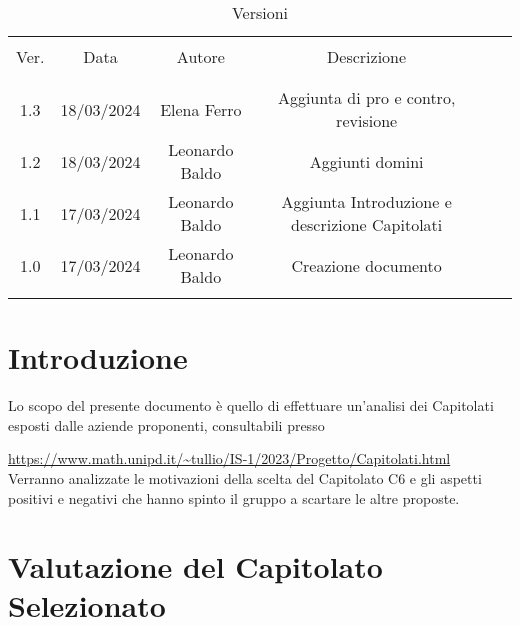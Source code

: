 \documentclass[italian,12pt]{article} %
\begin{document}


\newpage



\begin{table}[!h]
	\caption{Versioni}
	\begin{center}
		\begin{tabular}{ c c c c c c }
			\hline                                                                              \\[-2ex]
			Ver. & Data       & Autore         & Descrizione                                    \\
			\\[-2ex] \hline \\[-1.5ex]
			1.3  & 18/03/2024 & Elena Ferro    & Aggiunta di pro e contro, revisione            \\
			1.2  & 18/03/2024 & Leonardo Baldo & Aggiunti domini                                \\
			1.1  & 17/03/2024 & Leonardo Baldo & Aggiunta Introduzione e descrizione Capitolati \\
			1.0  & 17/03/2024 & Leonardo Baldo & Creazione documento                            \\

			\\[-1.5ex] \hline
		\end{tabular}
	\end{center}
\end{table}

\newpage

\tableofcontents

\newpage

\section{Introduzione}
Lo scopo del presente documento è quello di effettuare un'analisi dei Capitolati esposti
dalle aziende proponenti, consultabili presso

\url{https://www.math.unipd.it/~tullio/IS-1/2023/Progetto/Capitolati.html}\\
Verranno analizzate le motivazioni della scelta del Capitolato C6
e gli aspetti positivi e negativi che hanno spinto il gruppo a scartare le altre proposte.

\section{Valutazione del Capitolato Selezionato}
\end{document}
